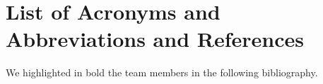 \documentclass[11pt]{article}
\begin{document}
\clearpage
\newpage


\section{List of Acronyms and Abbreviations and References}
\label{sec:acronyms}


\clearpage
\newpage


We highlighted in bold the team members in the following bibliography.




\clearpage
\newpage
\end{document}
